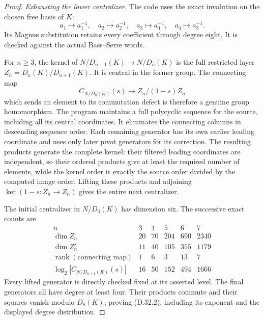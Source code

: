\begin{proof}
\emph{Exhausting the lower centralizer.}
The code uses the exact involution on the chosen
free basis of $K$:
\[
 a_1\mapsto a_1^{-1},\quad a_2\mapsto a_2^{-1},\quad
 a_3\mapsto a_4^{-1},\quad a_4\mapsto a_3^{-1}.
                                                            \tag{D.32.5}
\]
Its Magnus substitution retains every coefficient
through degree eight. It is checked against the
actual Bass--Serre words.

For $n\geq3$, the kernel of
$N/D_{n+1}(K)\to N/D_n(K)$ is the full restricted
layer $Z_n=D_n(K)/D_{n+1}(K)$. It is central in
the former group. The connecting map
\[
 C_{N/D_n(K)}(s)\longrightarrow Z_n/(1-s)Z_n
                                                            \tag{D.32.6}
\]
which sends an element to its commutation defect
is therefore a genuine group homomorphism. The
program maintains a full polycyclic sequence for
the source, including all its central coordinates.
It eliminates the connecting columns in descending
sequence order. Each remaining generator has its
own earlier leading coordinate and uses only later
pivot generators for its correction. The resulting
products generate the complete kernel: their
filtered leading coordinates are independent, so
their ordered products give at least the required
number of elements, while the kernel order is
exactly the source order divided by the computed
image order. Lifting these products and adjoining
$\ker(1-s:Z_n\to Z_n)$ gives the entire next
centralizer.

The initial centralizer in $N/D_3(K)$ has dimension
six. The successive exact counts are
\[
\begin{array}{c|rrrrr}
 n&3&4&5&6&7\\\hline
 \dim Z_n&20&70&204&690&2340\\
 \dim Z_n^s&11&40&105&355&1179\\
 \operatorname{rank}(\text{connecting map})&1&6&3&13&7\\
 \log_2|C_{N/D_{n+1}(K)}(s)|&16&50&152&494&1666
\end{array}                                                   \tag{D.32.7}
\]
Every lifted generator is directly checked fixed
at its asserted level. The final generators all
have degree at least four. Their products commute
and their squares vanish modulo $D_8(K)$, proving
(D.32.2), including its exponent and the displayed
degree distribution.


\end{proof}

